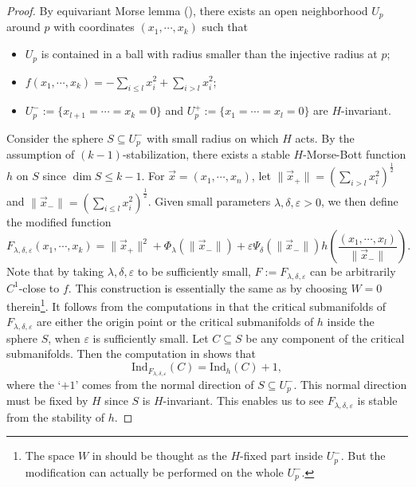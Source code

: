 \documentclass[11pt]{amsart}
\theoremstyle{definition}
\numberwithin{equation}{subsection}
\begin{document}
\begin{proof}
By equivariant Morse lemma (\cite[Lemma 4.1]{wasserman1969equivariant}), there exists an open neighborhood $U_p$ around $p$ with coordinates $(x_1,\cdots,x_k)$ such that \begin{itemize}
    \item $U_p$ is contained in a ball with radius smaller than the injective radius at $p$;
    \item $f(x_1,\cdots,x_k)=-\sum_{i\leq l}x_i^2+\sum_{i>l}x_i^2$;
    \item $U_p^-:=\{x_{l+1}=\cdots=x_k=0\}$ and $U_p^+:=\{x_{1}=\cdots=x_l=0\}$ are $H$-invariant.
\end{itemize} Consider the sphere $S\subseteq U_p^-$ with small radius on which $H$ acts. By the assumption of $(k-1)$-stabilization, there exists a stable $H$-Morse-Bott function $h$ on $S$ since $\dim S\leq k-1$. For $\vec{x}=(x_1,\cdots,x_n)$, let $\|\vec{x}_+\|=(\sum_{i>l}x_i^2)^{\frac{1}{2}}$ and  $\|\vec{x}_-\|=(\sum_{i\leq l}x_i^2)^{\frac{1}{2}}$. Given small parameters $\lambda,\delta,\varepsilon>0$, we then define the modified function
\[F_{\lambda,\delta,\varepsilon}(x_1,\cdots,x_k)=\|\vec{x}_+\|^2+\Phi_{\lambda}(\|\vec{x}_-\|)+\varepsilon\Psi_{\delta}(\|\vec{x}_-\|)h(\frac{(x_1,\cdots,x_l)}{\|\vec{x}_-\|}).\]
Note that by taking $\lambda,\delta,\varepsilon$ to be sufficiently small, $F:=F_{\lambda,\delta,\varepsilon}$ can be arbitrarily $C^1$-close to $f$. This construction is essentially the same as \cite[Construction 6.5]{bao2024morse} by choosing $W=0$ therein\footnote{The space $W$ in \cite{bao2024morse} should be thought as the $H$-fixed part inside $U_p^-$. But the modification can actually be performed on the whole $U_p^-$.}. It follows from the computations in \cite[Proposition 6.6 (4)]{bao2024morse} that the critical submanifolds of $F_{\lambda,\delta,\varepsilon}$ are either the origin point or the critical submanifolds of $h$ inside the sphere $S$, when $\varepsilon$ is sufficiently small. Let $C\subseteq S$ be any component of the critical submanifolds. Then the computation in \cite[Proposition 6.6 (5)]{bao2024morse} shows that \[\text{Ind}_{F_{\lambda,\delta,\varepsilon}}(C)=\text{Ind}_{h}(C)+1,\] where the `$+1$' comes from the normal direction of $S\subseteq U_p^-$. This normal direction must be fixed by $H$ since $S$ is $H$-invariant. This enables us to see $F_{\lambda,\delta,\varepsilon}$ is stable from the stability of $h$. 
\end{proof}
\end{document}
